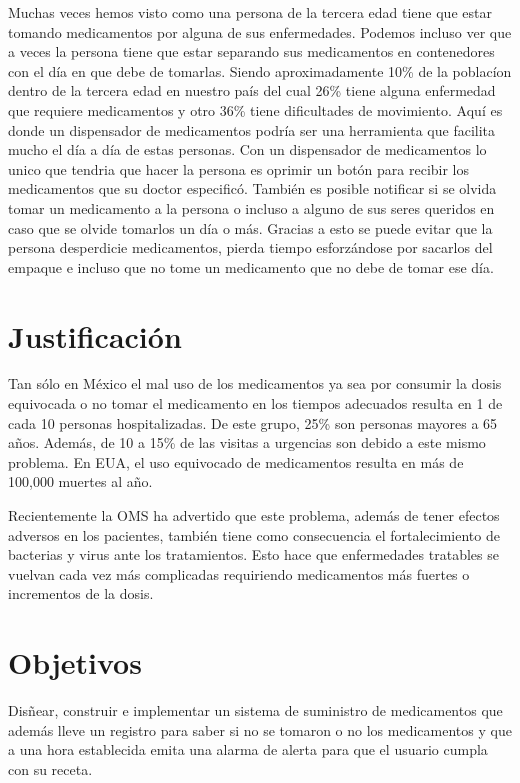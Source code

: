 \documentclass[12pt]{article}
\begin{document}
Muchas veces hemos visto como una persona de la tercera edad tiene que estar tomando medicamentos por alguna de sus enfermedades. Podemos incluso ver que a veces la persona tiene que estar separando sus medicamentos en contenedores con el d\'ia en que debe de tomarlas. Siendo aproximadamente 10\% de la poblac\'ion dentro de la tercera edad en nuestro pa\'is del cual 26\% tiene alguna enfermedad que requiere medicamentos y otro 36\% tiene dificultades de movimiento. Aqu\'i es donde un dispensador de medicamentos podr\'ia ser una herramienta que facilita mucho el d\'ia a d\'ia de estas personas. Con un dispensador de medicamentos lo unico que tendria que hacer la persona es oprimir un bot\'on para recibir los medicamentos que su doctor especific\'o. Tambi\'en es posible notificar si se olvida tomar un medicamento a la persona o incluso a alguno de sus seres queridos en caso que se olvide tomarlos un d\'ia o m\'as. Gracias a esto se puede evitar que la persona desperdicie medicamentos, pierda tiempo esforz\'andose por sacarlos del empaque e incluso que no tome un medicamento que no debe de tomar ese d\'ia. 


\section*{Justificaci\'on}

Tan s\'olo en M\'exico el mal uso de los medicamentos ya sea por consumir la dosis equivocada o no tomar el medicamento en los tiempos adecuados resulta en 1 de cada 10 personas hospitalizadas. De este grupo, 25\% son personas mayores a 65 a\~nos. Adem\'as, de 10 a 15\% de las visitas a urgencias son debido a este mismo problema. En EUA, el uso equivocado de medicamentos resulta en más de 100,000 muertes al a\~no.

Recientemente la OMS ha advertido que este problema, adem\'as de tener efectos adversos en los pacientes, tambi\'en tiene como consecuencia el fortalecimiento de bacterias y virus ante los tratamientos. Esto hace que enfermedades tratables se vuelvan cada vez m\'as complicadas requiriendo medicamentos m\'as fuertes o incrementos de la dosis.

\section*{Objetivos}

Dis\~near, construir e implementar un sistema de suministro de medicamentos que adem\'as lleve un registro para saber si no se tomaron o no los medicamentos y que a una hora establecida emita una alarma de alerta para que el usuario cumpla con su receta. 
\end{document}
